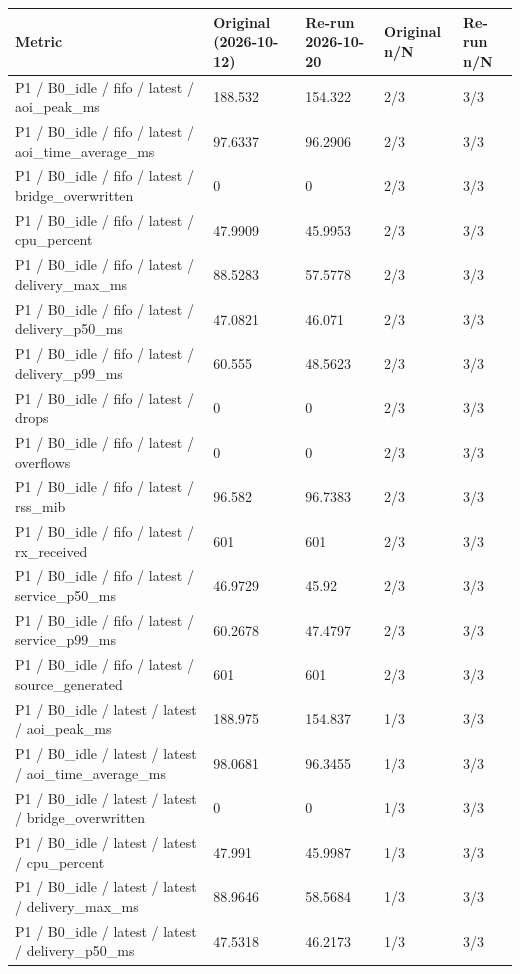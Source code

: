 \begin{tabular}{@{}lllll@{}}
\toprule
Metric & Original (2026-10-12) & Re-run 2026-10-20 & Original n/N & Re-run n/N \\
\midrule
P1 / B0\_idle / fifo / latest / aoi\_peak\_ms & 188.532 & 154.322 & 2/3 & 3/3 \\
P1 / B0\_idle / fifo / latest / aoi\_time\_average\_ms & 97.6337 & 96.2906 & 2/3 & 3/3 \\
P1 / B0\_idle / fifo / latest / bridge\_overwritten & 0 & 0 & 2/3 & 3/3 \\
P1 / B0\_idle / fifo / latest / cpu\_percent & 47.9909 & 45.9953 & 2/3 & 3/3 \\
P1 / B0\_idle / fifo / latest / delivery\_max\_ms & 88.5283 & 57.5778 & 2/3 & 3/3 \\
P1 / B0\_idle / fifo / latest / delivery\_p50\_ms & 47.0821 & 46.071 & 2/3 & 3/3 \\
P1 / B0\_idle / fifo / latest / delivery\_p99\_ms & 60.555 & 48.5623 & 2/3 & 3/3 \\
P1 / B0\_idle / fifo / latest / drops & 0 & 0 & 2/3 & 3/3 \\
P1 / B0\_idle / fifo / latest / overflows & 0 & 0 & 2/3 & 3/3 \\
P1 / B0\_idle / fifo / latest / rss\_mib & 96.582 & 96.7383 & 2/3 & 3/3 \\
P1 / B0\_idle / fifo / latest / rx\_received & 601 & 601 & 2/3 & 3/3 \\
P1 / B0\_idle / fifo / latest / service\_p50\_ms & 46.9729 & 45.92 & 2/3 & 3/3 \\
P1 / B0\_idle / fifo / latest / service\_p99\_ms & 60.2678 & 47.4797 & 2/3 & 3/3 \\
P1 / B0\_idle / fifo / latest / source\_generated & 601 & 601 & 2/3 & 3/3 \\
P1 / B0\_idle / latest / latest / aoi\_peak\_ms & 188.975 & 154.837 & 1/3 & 3/3 \\
P1 / B0\_idle / latest / latest / aoi\_time\_average\_ms & 98.0681 & 96.3455 & 1/3 & 3/3 \\
P1 / B0\_idle / latest / latest / bridge\_overwritten & 0 & 0 & 1/3 & 3/3 \\
P1 / B0\_idle / latest / latest / cpu\_percent & 47.991 & 45.9987 & 1/3 & 3/3 \\
P1 / B0\_idle / latest / latest / delivery\_max\_ms & 88.9646 & 58.5684 & 1/3 & 3/3 \\
P1 / B0\_idle / latest / latest / delivery\_p50\_ms & 47.5318 & 46.2173 & 1/3 & 3/3 \\

\end{tabular}
